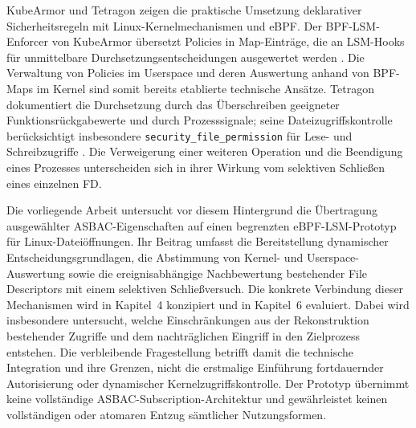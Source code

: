 KubeArmor und Tetragon zeigen die praktische Umsetzung deklarativer Sicherheitsregeln mit Linux-Kernelmechanismen und eBPF.
Der BPF-LSM-Enforcer von KubeArmor übersetzt Policies in Map-Einträge, die an LSM-Hooks für unmittelbare Durchsetzungsentscheidungen ausgewertet werden \citep{kubearmorRuntimeEnforcer}.
Die Verwaltung von Policies im Userspace und deren Auswertung anhand von BPF-Maps im Kernel sind somit bereits etablierte technische Ansätze.
Tetragon dokumentiert die Durchsetzung durch das Überschreiben geeigneter Funktionsrückgabewerte und durch Prozesssignale; seine Dateizugriffskontrolle berücksichtigt insbesondere \texttt{security\_file\_permission} für Lese- und Schreibzugriffe \citep{tetragonEnforcement,tetragonFilenameAccess}.
Die Verweigerung einer weiteren Operation und die Beendigung eines Prozesses unterscheiden sich in ihrer Wirkung vom selektiven Schließen eines einzelnen FD.

Die vorliegende Arbeit untersucht vor diesem Hintergrund die Übertragung ausgewählter ASBAC-Eigenschaften auf einen begrenzten eBPF-LSM-Prototyp für Linux-Dateiöffnungen.
Ihr Beitrag umfasst die Bereitstellung dynamischer Entscheidungsgrundlagen, die Abstimmung von Kernel- und Userspace-Auswertung sowie die ereignisabhängige Nachbewertung bestehender File Descriptors mit einem selektiven Schließversuch.
Die konkrete Verbindung dieser Mechanismen wird in Kapitel~4 konzipiert und in Kapitel~6 evaluiert.
Dabei wird insbesondere untersucht, welche Einschränkungen aus der Rekonstruktion bestehender Zugriffe und dem nachträglichen Eingriff in den Zielprozess entstehen.
Die verbleibende Fragestellung betrifft damit die technische Integration und ihre Grenzen, nicht die erstmalige Einführung fortdauernder Autorisierung oder dynamischer Kernelzugriffskontrolle.
Der Prototyp übernimmt keine vollständige ASBAC-Subscription-Architektur und gewährleistet keinen vollständigen oder atomaren Entzug sämtlicher Nutzungsformen.


\newpage
